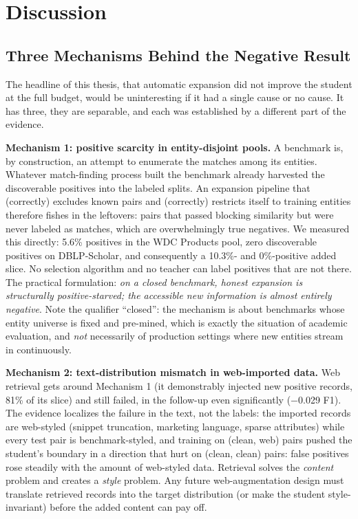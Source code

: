 \documentclass[a4paper,oneside,bibliography=totoc]{scrbook}
\begin{document}
\chapter{Discussion}
\label{ch:discussion}

\section{Three Mechanisms Behind the Negative Result}
\label{sec:disc_mechanisms}

The headline of this thesis, that automatic expansion did not improve the student at the full budget, would be uninteresting if it had a single cause or no cause. It has three, they are separable, and each was established by a different part of the evidence.

\textbf{Mechanism 1: positive scarcity in entity-disjoint pools.} A benchmark is, by construction, an attempt to enumerate the matches among its entities. Whatever match-finding process built the benchmark already harvested the discoverable positives into the labeled splits. An expansion pipeline that (correctly) excludes known pairs and (correctly) restricts itself to training entities therefore fishes in the leftovers: pairs that passed blocking similarity but were never labeled as matches, which are overwhelmingly true negatives. We measured this directly: 5.6\% positives in the WDC Products pool, zero discoverable positives on DBLP-Scholar, and consequently a 10.3\%- and 0\%-positive added slice. No selection algorithm and no teacher can label positives that are not there. The practical formulation: \emph{on a closed benchmark, honest expansion is structurally positive-starved; the accessible new information is almost entirely negative}. Note the qualifier ``closed'': the mechanism is about benchmarks whose entity universe is fixed and pre-mined, which is exactly the situation of academic evaluation, and \emph{not} necessarily of production settings where new entities stream in continuously.

\textbf{Mechanism 2: text-distribution mismatch in web-imported data.} Web retrieval gets around Mechanism 1 (it demonstrably injected new positive records, 81\% of its slice) and still failed, in the follow-up even significantly ($-$0.029 F1). The evidence localizes the failure in the text, not the labels: the imported records are web-styled (snippet truncation, marketing language, sparse attributes) while every test pair is benchmark-styled, and training on (clean, web) pairs pushed the student's boundary in a direction that hurt on (clean, clean) pairs: false positives rose steadily with the amount of web-styled data. Retrieval solves the \emph{content} problem and creates a \emph{style} problem. Any future web-augmentation design must translate retrieved records into the target distribution (or make the student style-invariant) before the added content can pay off.
\end{document}
